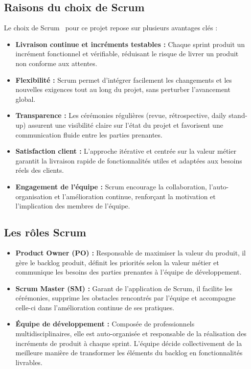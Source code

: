\subsection{Raisons du choix de Scrum}
Le choix de Scrum~\cite{scrum} pour ce projet repose sur plusieurs avantages clés :
\begin{itemize}[label=\textbullet, leftmargin=1.5cm]
    \item \textbf{Livraison continue et incréments testables :} Chaque sprint produit un incrément fonctionnel et vérifiable, réduisant le risque de livrer un produit non conforme aux attentes.
    \item \textbf{Flexibilité :} Scrum permet d'intégrer facilement les changements et les nouvelles exigences tout au long du projet, sans perturber l'avancement global.
    \item \textbf{Transparence :} Les cérémonies régulières (revue, rétrospective, daily stand-up) assurent une visibilité claire sur l'état du projet et favorisent une communication fluide entre les parties prenantes.
    \item \textbf{Satisfaction client :} L'approche itérative et centrée sur la valeur métier garantit la livraison rapide de fonctionnalités utiles et adaptées aux besoins réels des clients.
    \item \textbf{Engagement de l'équipe :} Scrum encourage la collaboration, l'auto-organisation et l'amélioration continue, renforçant la motivation et l'implication des membres de l'équipe.
\end{itemize}

\subsection{Les rôles Scrum}
\begin{itemize}[label=\textbullet, leftmargin=1.5cm]
    \item \textbf{Product Owner (PO) :}
    Responsable de maximiser la valeur du produit, il gère le backlog produit, définit les priorités selon la valeur métier et communique les besoins des parties prenantes à l'équipe de développement.

    \item \textbf{Scrum Master (SM) :}
    Garant de l'application de Scrum, il facilite les cérémonies, supprime les obstacles rencontrés par l'équipe et accompagne celle-ci dans l'amélioration continue de ses pratiques.

    \item \textbf{Équipe de développement :}
    Composée de professionnels multidisciplinaires, elle est auto-organisée et responsable de la réalisation des incréments de produit à chaque sprint. L'équipe décide collectivement de la meilleure manière de transformer les éléments du backlog en fonctionnalités livrables.
\end{itemize}

